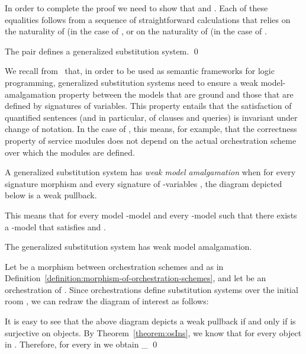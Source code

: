 \documentclass{LMCS}
\begin{document}
  In order to complete the proof we need to show that  and .
  Each of these equalities follows from a sequence of straightforward calculations that relies on the naturality of  (in the case of , or on the naturality of  (in the case of .
  

  \begin{cor}
    The pair  defines a generalized substitution system.
    \qed
  \end{cor}

  We recall from~\cite{Tutu-Fiadeiro:Institution-independent-logic-programming-2015} that, in order to be used as semantic frameworks for logic programming, generalized substitution systems need to ensure a weak model-amalgamation property between the models that are ground and those that are defined by signatures of variables.
  This property entails that the satisfaction of quantified sentences (and in particular, of clauses and queries) is invariant under change of notation.
  In the case of , this means, for example, that the correctness property of service modules does not depend on the actual orchestration scheme over which the modules are defined.

  \begin{defi}
    A generalized substitution system  has \emph{weak model amalgamation} when for every signature morphism  and every signature of \nb-variables , the diagram depicted below is a weak pullback.
    
  \end{defi}

  \noindent This means that for every model \nb-model  and every \nb-model  such that  there exists a \nb-model  that satisfies  and .

  \begin{prop}
    \label{proposition:weak-model-amalgamation-in-OrcScheme}
    The generalized substitution system  has weak model amalgamation.
  \end{prop}

  \proof
  Let  be a morphism  between orchestration schemes  and  as in Definition~\ref{definition:morphism-of-orchestration-schemes}, and let  be an orchestration of .
  Since orchestrations define substitution systems over the initial room , we can redraw the diagram of interest as follows:
  
  It is easy to see that the above diagram depicts a weak pullback if and only if  is surjective on objects.
  By Theorem~\ref{theorem:osIns}, we know that  for every object  in .
  Therefore, for every  in  we obtain 
  \eta\eta_{\grc}
  \qed
\end{document}
